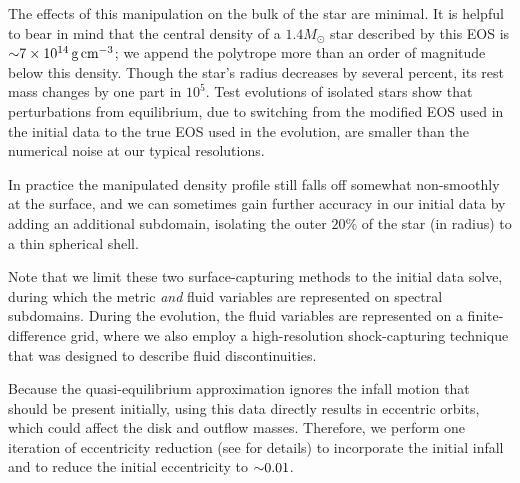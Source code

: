 The effects of this manipulation on the bulk of the star are minimal.
It is helpful to bear in mind that the central density of a $1.4 M_{\odot}$
star described by this EOS is $\mathord{\sim} 7 \times 10^{14}\,\text{g}\,\text{cm}^{-3}$;
we append the polytrope more than an order of magnitude below this density.
Though the star's radius decreases by several percent, its rest mass changes
by one part in $10^5$. Test evolutions of isolated stars show that perturbations
from equilibrium, due to switching from the modified EOS used in the initial data
to the true EOS used in the evolution, are smaller than the numerical noise at
our typical resolutions.

In practice the manipulated density profile still falls off somewhat
non-smoothly at the surface, and we can sometimes gain further
accuracy in our initial data by adding an additional subdomain, isolating
the outer $20\%$ of the star (in radius) to a thin spherical shell.

Note that we limit these two surface-capturing methods to the initial data solve,
during which the metric \emph{and} fluid variables are represented on spectral subdomains.
During the evolution, the fluid variables are represented on a finite-difference
grid, where we also employ a high-resolution shock-capturing technique that
was designed to describe fluid discontinuities.

Because the quasi-equilibrium approximation ignores the infall motion
that should be present initially, using this data directly results
in eccentric orbits, which could affect the disk and outflow masses.
Therefore, we perform one iteration of eccentricity reduction (see
\citealt{pfei2007-ecc_reduction} for details) to incorporate the initial
infall and to reduce the initial eccentricity to $\mathord{\sim}0.01$.

